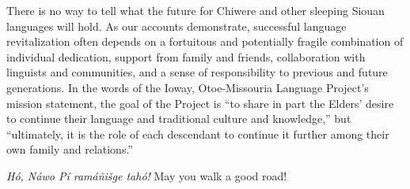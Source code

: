 \documentclass[output=paper]{LSP/langsci}
\begin{document}
There is no way to tell what the future for Chiwere and other sleeping Siouan languages will hold. As our accounts demonstrate, successful language revitalization often depends on a fortuitous and potentially fragile combination of individual dedication, support from family and friends, collaboration with linguists and communities, and a sense of responsibility to previous and future generations. In the words of the Ioway, Otoe-Missouria Language Project's mission statement, the goal of the Project is ``to share in part the Elders' desire to continue their language and traditional culture and knowledge,'' but ``ultimately, it is the role of each descendant to continue it further among their own family and relations.''

\emph{Hó, Náwo Pí ramáñišge tahó!}  May you walk a good road!

\printbibliography[heading=subbibliography,notkeyword=this]
\end{document}
